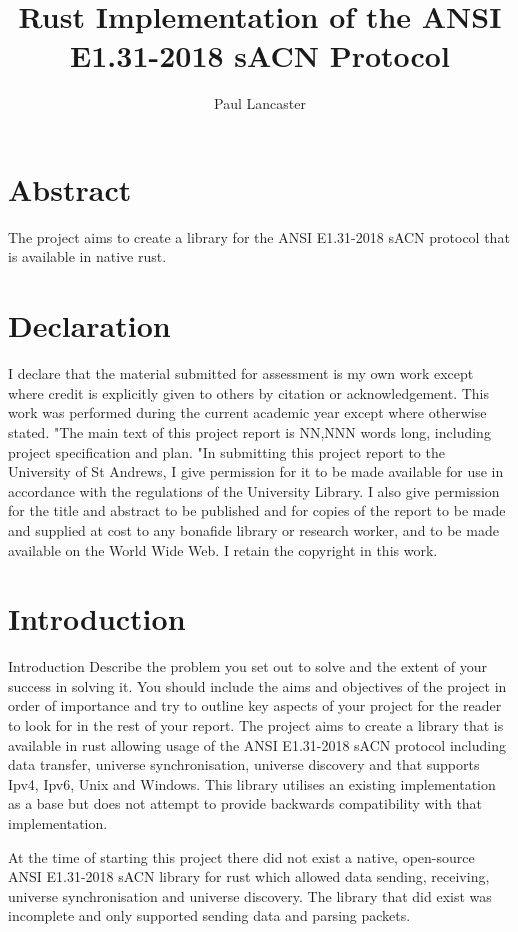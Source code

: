 \documentclass[11pt,a4paper]{report}
\author{Paul Lancaster}
\title{Rust Implementation of the ANSI E1.31-2018 sACN Protocol}
\begin{document}


\section{Abstract}
The project aims to create a library for the ANSI E1.31-2018 sACN protocol \cite{ANSI_E1.31} that is available in native rust.

\section{Declaration}
I declare that the material submitted for
assessment is my own work except where credit is
explicitly given to others by citation or
acknowledgement. This work was performed during
the current academic year except where otherwise
stated.
"The main text of this project report is NN,NNN
words long, including project specification and plan.
"In submitting this project report to the University of
St Andrews, I give permission for it to be made
available for use in accordance with the regulations of the University Library. I also give permission for
the title and abstract to be published and for copies of the report to be made and supplied at cost to any bonafide library or research worker, and to be made
available on the World Wide Web. I retain the
copyright in this work.


\tableofcontents
\pagebreak

\section{Introduction}
	Introduction
	Describe the problem you set out to solve and the
	extent of your success in solving it. You should include
	the aims and objectives of the project in order of
	importance and try to outline key aspects of your
	project for the reader to look for in the rest of your
	report.
The project aims to create a library that is available in rust allowing usage of the ANSI E1.31-2018 sACN \cite{ANSI_E1.31} protocol including data transfer, universe synchronisation, universe discovery and that supports Ipv4, Ipv6, Unix and Windows. This library utilises an existing implementation \cite{ORIGINAL_IMPL} as a base but does not attempt to provide backwards compatibility with that implementation.
	
At the time of starting this project there did not exist a native, open-source ANSI E1.31-2018 sACN library for rust which allowed data sending, receiving, universe synchronisation and universe discovery.  The library that did exist was incomplete and only supported sending data and parsing packets.\\
\end{document}
